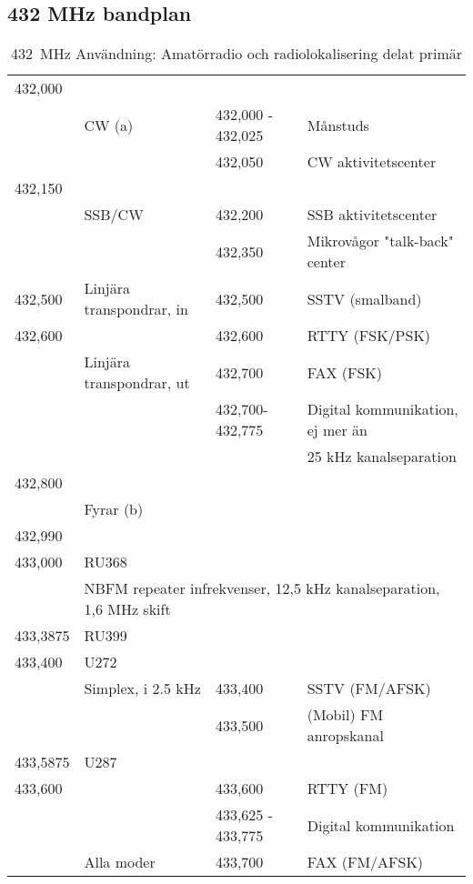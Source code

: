 \subsection{432 MHz bandplan}

\setlongtables
\begin{longtable}{llll}
\caption{432~MHz Användning: Amatörradio och radiolokalisering delat primär} \\
432,000 &        & & \\
        & CW (a) & 432,000 - 432,025 & Månstuds \\
        &        & 432,050           & CW aktivitetscenter \\
432,150 &        & & \\
        & SSB/CW & 432,200           & SSB aktivitetscenter \\
        &        & 432,350           & Mikrovågor "talk-back" center \\
432,500 & Linjära transpondrar, in & 432,500 & SSTV (smalband) \\
432,600 &                          & 432,600 & RTTY (FSK/PSK) \\
        & Linjära transpondrar, ut & 432,700 & FAX (FSK) \\
        &                          & 432,700- 432,775 & Digital kommunikation, ej mer än \\
        &                          &         & 25 kHz kanalseparation \\
432,800 & & & \\
        & \multicolumn{3}{l}{Fyrar (b)} \\
432,990 & & & \\
433,000 & RU368 & & \\
        & \multicolumn{3}{l}{NBFM repeater infrekvenser, 12,5 kHz kanalseparation, 1,6 MHz skift} \\
433,3875 & RU399 & & \\
433,400 & U272 & & \\
        & Simplex, i 2.5 kHz & 433,400 & SSTV (FM/AFSK) \\
        &                    & 433,500 & (Mobil) FM anropskanal \\
433,5875 & U287 & & \\
433,600 &            & 433,600           & RTTY (FM) \\
        &            & 433,625 - 433,775 & Digital kommunikation \\
        & Alla moder & 433,700           & FAX (FM/AFSK) \\

\end{longtable}
